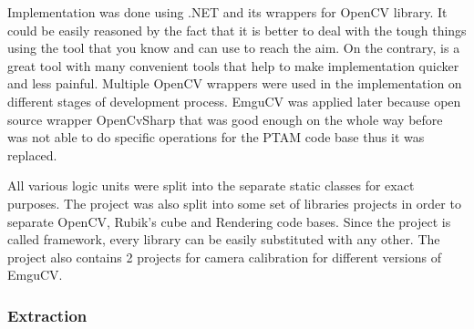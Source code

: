 \documentclass[../../main.tex]{subfiles}
\begin{document}
Implementation was done using .NET {\Csharp} and its wrappers for OpenCV library. It could be easily reasoned by the fact that it is better to deal with the tough things using the tool that you know and can use to reach the aim. On the contrary, {\Csharp} is a great tool with many convenient tools that help to make implementation quicker and less painful.
Multiple \ac{OpenCV} wrappers were used in the implementation on different stages of development process. \ac{EmguCV} was applied later because open source wrapper OpenCvSharp that was good enough on the whole way before was not able to do specific operations for the \ac{PTAM} code base thus it was replaced.

All various logic units were split into the separate static classes for exact purposes. The project was also split into some set of libraries projects in order to separate \ac{OpenCV}, Rubik's cube and Rendering code bases. Since the project is called framework, every library can be easily substituted with any other. The project also contains 2 projects for camera calibration for different versions of \ac{EmguCV}.

\subsubsection*{Extraction}
\end{document}
